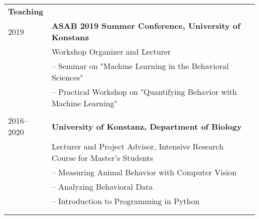 \documentclass[letterpaper,10pt,oneside]{article}
\begin{document}
\begin{small}
\begin{longtable}{@{} l p{5.3in}l}
\Large{\textbf{Teaching}}  \vspace{5mm} \\
 \large{2019}
	& \textbf{ASAB 2019 Summer Conference, University of Konstanz} \\
	& Workshop Organizer and Lecturer\\
	& – Seminar on "Machine Learning in the Behavioral Sciences" \\
	& – Practical Workshop on "Quantifying Behavior with Machine Learning" \\
	& \\
 \large{2016–2020}
    & \textbf{University of Konstanz, Department of Biology} \\
     & Lecturer and Project Advisor, Intensive Research Course for Master's Students \\
     & – Measuring Animal Behavior with Computer Vision \\
     & – Analyzing Behavioral Data \\
     & – Introduction to Programming in Python\\
     & \\
 & \\
 

\end{longtable}
\end{small}
\end{document}
